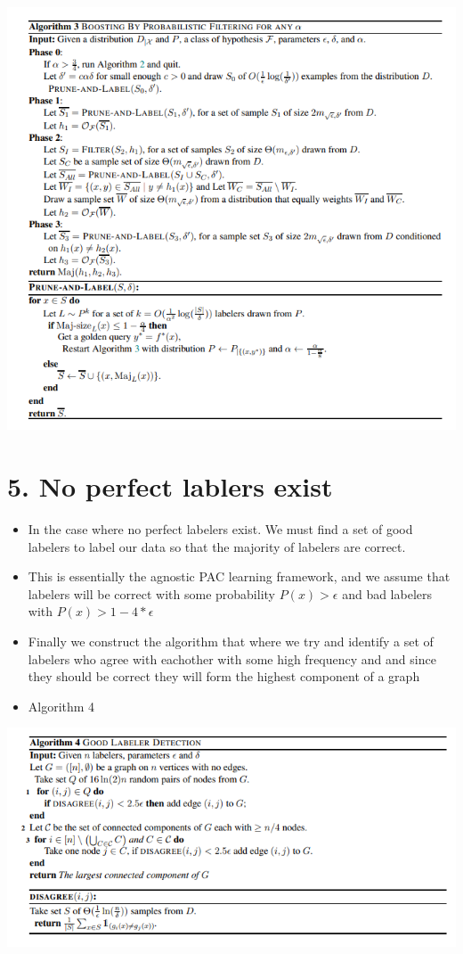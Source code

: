 \documentclass[11pt]{article}
\begin{document}
\begin{center}
\includegraphics[width=.9\linewidth]{./images/Algo3.png}
\end{center}
\section{5. No perfect lablers exist}
\label{sec:org5ed2d0b}
\begin{itemize}
\item In the case where no perfect labelers exist. We must find a set of good labelers to label our data so that the majority of labelers are correct.
\item This is essentially the agnostic PAC learning framework, and we assume that labelers will be correct with some probability  \(P(x) > \epsilon\) and bad labelers with \(P(x) > 1-4* \epsilon\)
\item Finally we construct the algorithm that where we try and identify a set of labelers who agree with eachother with some high frequency and and since they  should be correct they will form the highest component of a graph
\item Algorithm 4
\end{itemize}
\begin{center}
\includegraphics[width=.9\linewidth]{./images/Algo4.png}
\end{center}
\end{document}
